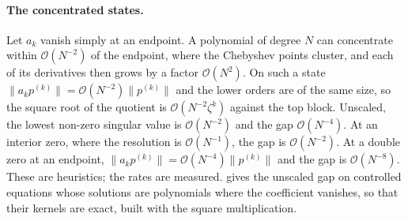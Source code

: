 \paragraph{The concentrated states.} Let $a_k$ vanish simply at an endpoint. A polynomial of degree $N$ can concentrate within $\mathcal{O}(N^{-2})$ of the endpoint, where the Chebyshev points cluster, and each of its derivatives then grows by a factor $\mathcal{O}(N^2)$. On such a state $\|a_kp^{(k)}\|=\mathcal{O}(N^{-2})\|p^{(k)}\|$ and the lower orders are of the same size, so the square root of the quotient is $\mathcal{O}(N^{-2}\zeta^k)$ against the top block. Unscaled, the lowest non-zero singular value is $\mathcal{O}(N^{-2})$ and the gap $\mathcal{O}(N^{-4})$. At an interior zero, where the resolution is $\mathcal{O}(N^{-1})$, the gap is $\mathcal{O}(N^{-2})$. At a double zero at an endpoint, $\|a_kp^{(k)}\|=\mathcal{O}(N^{-4})\|p^{(k)}\|$ and the gap is $\mathcal{O}(N^{-8})$. These are heuristics; the rates are measured.  gives the unscaled gap on controlled equations whose solutions are polynomials where the coefficient vanishes, so that their kernels are exact, built with the square multiplication.

